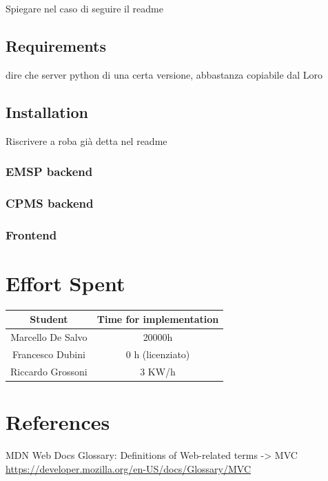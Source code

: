 \documentclass[table, 12pt]{article}
\begin{document}
Spiegare nel caso di seguire il readme 

\subsection{Requirements}
dire che server python di una certa versione, abbastanza copiabile dal Loro

\subsection{Installation}
Riscrivere a roba già detta nel readme
\subsubsection{EMSP backend}
\subsubsection{CPMS backend}
\subsubsection{Frontend}


\newpage
\section{Effort Spent}
    \begin{tabular}{|c||c|}
        \hline
        Student & Time for implementation\\ \hline
        Marcello De Salvo & 20000h  \\
        Francesco Dubini & 0 h (licenziato) \\
        Riccardo Grossoni & 3 KW/h \\
        \hline
    \end{tabular}


\section{References}


\begin{thebibliography}{9}
    MDN Web Docs Glossary: Definitions of Web-related terms -> MVC
    \url{https://developer.mozilla.org/en-US/docs/Glossary/MVC}

    
\end{thebibliography}
\end{document}
